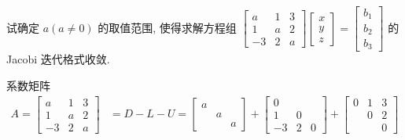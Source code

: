 \begin{tcolorbox}[breakable,
		colframe=white!10!jingga, coltitle=white!90!jingga, colback=white!95!jingga, coltext=black, colbacktitle=white!10!jingga, enhanced, fonttitle=\bfseries,fontupper=\normalsize, attach boxed title to top left={yshift=-2mm}, before skip=8pt, after skip=8pt,
		title=解答题]

 试确定 $a(a \neq 0)$ 的取值范围, 使得求解方程组
$
\left[\begin{array}{ccc}
a & 1 & 3 \\
1 & a & 2 \\
-3 & 2 & a
\end{array}\right]\left[\begin{array}{l}
x \\
y \\
z
\end{array}\right]=\left[\begin{array}{l}
b_{1} \\
b_{2} \\
b_{3}
\end{array}\right] 
$
的 Jacobi 迭代格式收敛. 

 \tcblower
系数矩阵
$$
\begin{aligned}
A=\left[\begin{array}{ccc}
a & 1 & 3 \\
1 & a & 2 \\
-3 & 2 & a
\end{array}\right] & =D-L-U  =\left[\begin{array}{lll}
a & & \\
& a & \\
& & a
\end{array}\right]+\left[\begin{array}{ccc}
0 & \\
1 & 0 \\
-3 & 2 & 0
\end{array}\right]+\left[\begin{array}{lll}
0 & 1 & 3 \\
& 0 & 2 \\
& & 0
\end{array}\right]
\end{aligned}
$$


\end{tcolorbox}
